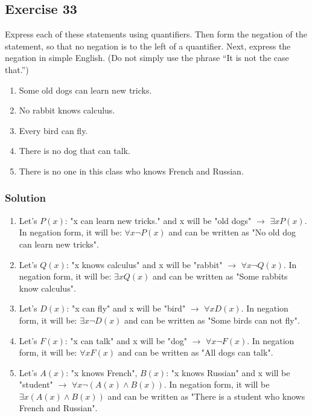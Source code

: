 \documentclass{article}
\begin{document}
\subsection*{Exercise 33}
Express each of these statements using quantifiers. Then form the negation of the statement, so that no negation is to the left of a quantifier. Next, express the negation in simple English. (Do not simply use the phrase “It is not the case that.”)
\begin{enumerate} [label = (\alph*)]
    \item Some old dogs can learn new tricks.
    \item No rabbit knows calculus.
    \item Every bird can fly.
    \item There is no dog that can talk.
    \item There is no one in this class who knows French and Russian.
\end{enumerate}
\subsubsection*{Solution}
\begin{enumerate} [label = (\alph*)]
    \item Let's $P(x)$: "x can learn new tricks." and x will be "old dogs" $\rightarrow$ $\exists xP(x)$. In negation form, it will be: $\forall x\lnot P(x)$ and can be written as "No old dog can learn new tricks".
    \item Let's $Q(x)$: "x knows calculus" and x will be "rabbit" $\rightarrow$ $\forall x \lnot Q(x)$. In negation form, it will be: $\exists x Q(x)$ and can be written as "Some rabbits know calculus".
    \item Let's $D(x)$: "x can fly" and x will be "bird" $\rightarrow$ $\forall xD(x)$. In negation form, it will be: $\exists x\lnot D(x)$ and can be written as "Some birds can not fly".
    \item Let's $F(x)$: "x can talk" and x will be "dog" $\rightarrow$ $\forall x\lnot F(x)$. In negation form, it will be: $\forall xF(x)$ and can be written as "All dogs can talk".
    \item Let's $A(x)$: "x knows French", $B(x)$: "x knows Russian" and x will be "student" $\rightarrow$ $\forall x\lnot(A(x) \land B(x))$. In negation form, it will be $\exists x(A(x) \land B(x))$ and can be written as "There is a student who knows French and Russian".
\end{enumerate}
\end{document}
